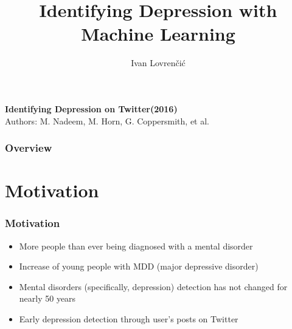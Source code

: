 \documentclass{beamer}
\title[Seminar]{Identifying Depression with Machine Learning} %
\author{Ivan Lovrenčić} %
\institute[FER] %
{
University of Zagreb, Faculty of Electrical Engineering and Computing \\ %
\medskip
\textit{ivan.lovrencic@fer.hr} %
}
\date{} %
\begin{document}
\begin{frame}
\titlepage %
\end{frame}

\begin{frame}
	
	
	\textbf{Identifying Depression on Twitter(2016)}\\
	Authors: M. Nadeem, M. Horn, G. Coppersmith, et al.
	
\end{frame}

\begin{frame}
\frametitle{Overview} %
\tableofcontents %
\end{frame}


\section{Motivation}

\begin{frame}
	\frametitle{Motivation}
	
	\begin{itemize}
			\item More people than ever being diagnosed with a mental disorder
			\item Increase of young people with MDD (major depressive disorder)
			\item Mental disorders (specifically, depression) detection has not changed for nearly 50 years
			\item Early depression detection through user's posts on Twitter
	\end{itemize}
	

\end{frame}
\end{document}
